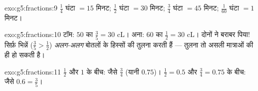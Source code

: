 \begin{solution}{exo:g5:fractions:9}
$\frac14$ घंटा $= 15$ मिनट; $\frac12$ घंटा $= 30$ मिनट;
$\frac34$ घंटा $= 45$ मिनट; $\frac{1}{60}$ घंटा $= 1$ मिनट।
\end{solution}

\begin{solution}{exo:g5:fractions:10}
टॉम: $50$ का $\frac35 = 30$ cL। अना: $60$ का $\frac12 = 30$ cL।
दोनों ने बराबर पिया! सिर्फ़ भिन्नें ($\frac35 > \frac12$)
\emph{अलग-अलग} बोतलों के हिस्सों की तुलना करती हैं --- तुलना तो
असली मात्राओं की ही हो सकती है।
\end{solution}

\begin{solution}{exo:g5:fractions:11}
$\frac12$ और $1$ के बीच: जैसे $\frac34$ (यानी $0.75$)।
$\frac12 = 0.5$ और $\frac34 = 0.75$ के बीच: जैसे $0.6 =
\frac35$।

\end{solution}
